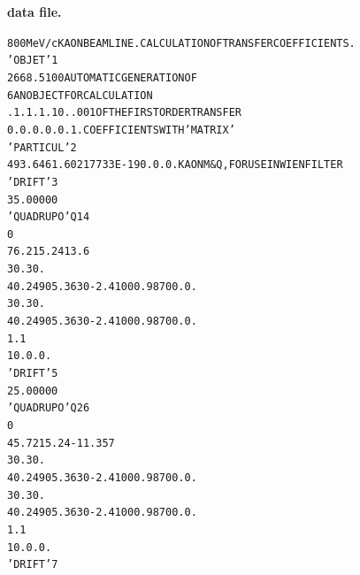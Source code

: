\begin{tiny}

\twocolumn
\noindent \textbf{\normalsize  \zgoubi data file.}
\begin{alltt}
    800 MeV/c KAON BEAM LINE. CALCULATION OF TRANSFER COEFFICIENTS.             
   'OBJET'                                                                 1
   2668.5100                             AUTOMATIC  GENERATION  OF              
   6                                     AN  OBJECT  FOR  CALCULATION           
   .1  .1  .1  .1 0.  .001      OF  THE  FIRST  ORDER  TRANSFER                 
   0. 0. 0. 0. 0. 1.                     COEFFICIENTS  WITH  'MATRIX'           
   'PARTICUL'                                                              2
    493.646 1.60217733E-19 0. 0. 0.      KAON M & Q, FOR USE IN WIEN FILTER     
   'DRIFT'                                                                 3
    35.00000                                                                    
   'QUADRUPO'                            Q1                                4
   0                                                        
     76.2  15.24  13.6                                                          
    30.  30.                                                                    
    4    0.2490   5.3630  -2.4100   0.9870   0.   0.                            
    30. 30.                                                                     
    4    0.2490   5.3630  -2.4100   0.9870   0.   0.                            
     1.1                                                                        
    1  0. 0. 0.                                                                 
   'DRIFT'                                                                 5
     25.00000                                                                   
   'QUADRUPO'                            Q2                                6
   0                                                        
   45.72  15.24   -11.357                                                       
    30. 30.                                                                     
    4    0.2490   5.3630  -2.4100   0.9870   0.   0.                            
    30. 30.                                                                     
    4    0.2490   5.3630  -2.4100   0.9870   0.   0.                            
     1.1                                                                        
    1  0. 0. 0.                                                                 
   'DRIFT'                                                                 7

\end{alltt}
\end{tiny}
